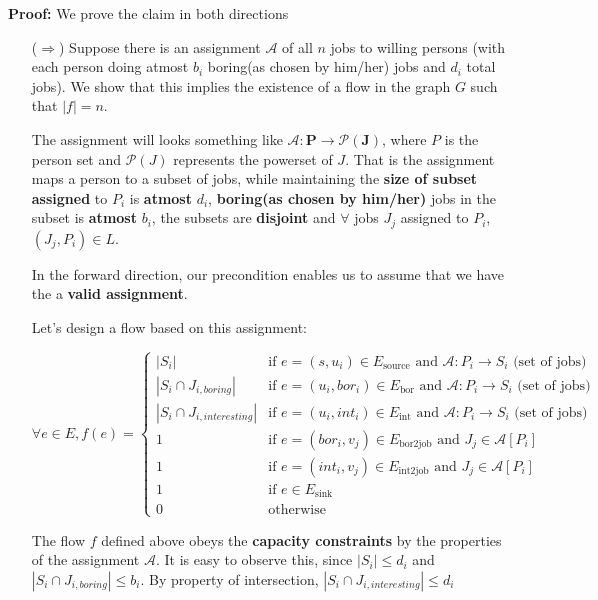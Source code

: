 \documentclass[11pt, fleqn]{article}
\begin{document}
\textbf{Proof: } We prove the claim in both directions
\begin{itemize}
    \item[($\Rightarrow$)] Suppose there is an assignment $\mathcal{A}$ of all $n$ jobs to willing persons (with each person doing atmost $b_i$ boring(as chosen by him/her) jobs and $d_i$  total jobs). We show that this implies the existence of a flow in the graph $G$ such that $|f|=n$. 
    
    The assignment will looks something like $\boldsymbol{\mathcal{A}: P \longrightarrow \mathcal{P}(J)}$, where $P$ is the person set and $\mathcal{P}(J)$ represents the powerset of $J$. That is the assignment maps a person to a subset of jobs, while maintaining the \textbf{size of subset assigned} to $P_i$ is \textbf{atmost} $d_i$, \textbf{boring(as chosen by him/her)} jobs in the subset is \textbf{atmost} $b_i$, the subsets are \textbf{disjoint} and $\forall$ jobs $J_j$ assigned to $P_i$, $(J_j,P_i) \in L$. 
    
    In the forward direction, our precondition enables us to assume that we have the a \textbf{valid assignment}.
    
    Let's design a flow based on this assignment:
    
    
    $$\forall e\in E, f(e)=\begin{cases}
    |S_i| & \text{if } e = (s,u_i) \in E_{\text{source}} \text{ and } \mathcal{A}: P_i \longrightarrow S_i \text{ (set of jobs)} \\
    |S_i \cap J_{i,boring}| & \text{if } e = (u_i,bor_i) \in E_{\text{bor}} \text{ and } \mathcal{A}: P_i \longrightarrow S_i \text{ (set of jobs)}\\
    |S_i \cap J_{i,interesting}| & \text{if } e = (u_i,int_i) \in E_{\text{int}} \text{ and } \mathcal{A}: P_i \longrightarrow S_i \text{ (set of jobs)}\\
    1 & \text{if } e = (bor_i,v_j) \in E_{\text{bor2job}} \text{ and $J_j \in \mathcal{A}[P_i]$ } \\
    1 & \text{if } e = (int_i,v_j) \in E_{\text{int2job}} \text{ and $J_j \in \mathcal{A}[P_i]$ }\\
    1 & \text{if } e \in E_{\text{sink}}\\
    0 & \text{otherwise}
    \end{cases}$$
    
    The flow $f$ defined above obeys the \textbf{capacity constraints} by the properties of the assignment $\mathcal{A}$. It is easy to observe this, since $|S_i| \leq d_i$ and $|S_i \cap J_{i,boring}| \leq b_i$. By property of intersection, $|S_i \cap J_{i,interesting}| \leq d_i$
    

\end{itemize}
\end{document}
